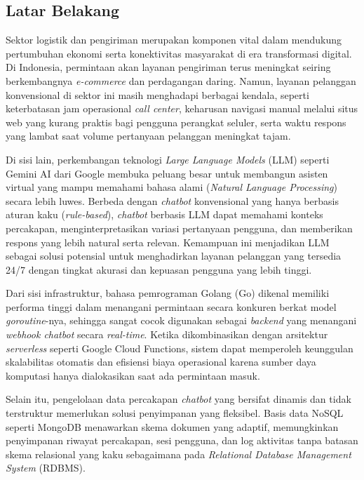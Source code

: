 
\subsection{Latar Belakang}

Sektor logistik dan pengiriman merupakan komponen vital dalam mendukung pertumbuhan ekonomi serta konektivitas masyarakat di era transformasi digital. Di Indonesia, permintaan akan layanan pengiriman terus meningkat seiring berkembangnya \textit{e-commerce} dan perdagangan daring. Namun, layanan pelanggan konvensional di sektor ini masih menghadapi berbagai kendala, seperti keterbatasan jam operasional \textit{call center}, keharusan navigasi manual melalui situs web yang kurang praktis bagi pengguna perangkat seluler, serta waktu respons yang lambat saat volume pertanyaan pelanggan meningkat tajam.

Di sisi lain, perkembangan teknologi \textit{Large Language Models} (LLM) seperti Gemini AI dari Google membuka peluang besar untuk membangun asisten virtual yang mampu memahami bahasa alami (\textit{Natural Language Processing}) secara lebih luwes. Berbeda dengan \textit{chatbot} konvensional yang hanya berbasis aturan kaku (\textit{rule-based}), \textit{chatbot} berbasis LLM dapat memahami konteks percakapan, menginterpretasikan variasi pertanyaan pengguna, dan memberikan respons yang lebih natural serta relevan. Kemampuan ini menjadikan LLM sebagai solusi potensial untuk menghadirkan layanan pelanggan yang tersedia 24/7 dengan tingkat akurasi dan kepuasan pengguna yang lebih tinggi.

Dari sisi infrastruktur, bahasa pemrograman Golang (Go) dikenal memiliki performa tinggi dalam menangani permintaan secara konkuren berkat model \textit{goroutine}-nya, sehingga sangat cocok digunakan sebagai \textit{backend} yang menangani \textit{webhook chatbot} secara \textit{real-time}. Ketika dikombinasikan dengan arsitektur \textit{serverless} seperti Google Cloud Functions, sistem dapat memperoleh keunggulan skalabilitas otomatis dan efisiensi biaya operasional karena sumber daya komputasi hanya dialokasikan saat ada permintaan masuk.

Selain itu, pengelolaan data percakapan \textit{chatbot} yang bersifat dinamis dan tidak terstruktur memerlukan solusi penyimpanan yang fleksibel. Basis data NoSQL seperti MongoDB menawarkan skema dokumen yang adaptif, memungkinkan penyimpanan riwayat percakapan, sesi pengguna, dan log aktivitas tanpa batasan skema relasional yang kaku sebagaimana pada \textit{Relational Database Management System} (RDBMS).

